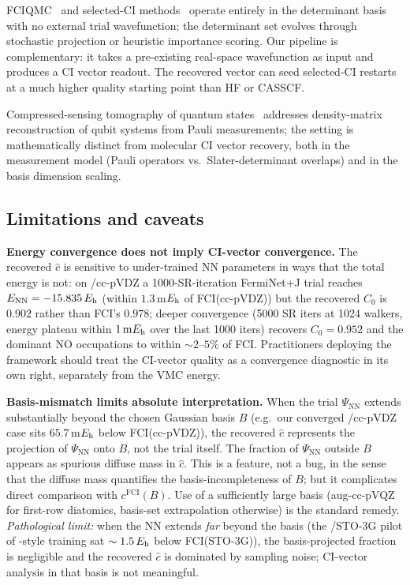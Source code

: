 \documentclass[journal=jctcce,manuscript=article,layout=traditional]{achemso}
\begin{document}
FCIQMC~\cite{Booth2009FCIQMC} and selected-CI
methods~\cite{Holmes2016HCI,Tubman2020ASCI,Garniron2019CIPSI,Eriksen2017MBE}
operate entirely in the determinant basis with no external trial
wavefunction; the determinant set evolves through stochastic
projection or heuristic importance scoring. Our pipeline is
complementary: it takes a pre-existing real-space wavefunction as
input and produces a CI vector readout. The recovered vector can
seed selected-CI restarts at a much higher quality starting point
than HF or CASSCF.

Compressed-sensing tomography of quantum
states~\cite{Gross2010QSCS,Torlai2018NQStomography} addresses
density-matrix reconstruction of qubit systems from Pauli
measurements; the setting is mathematically distinct from molecular
CI vector recovery, both in the measurement model (Pauli operators
vs.\ Slater-determinant overlaps) and in the basis dimension scaling.

\subsection{Limitations and caveats}

\textbf{Energy convergence does not imply CI-vector convergence.}
The recovered $\widehat c$ is sensitive to under-trained NN
parameters in ways that the total energy is not: on
/cc-pVDZ a 1000-SR-iteration FermiNet+J trial reaches
$E_{\rm NN} = -15.835\,E_{\rm h}$ (within $1.3$\,m$E_{\rm h}$ of
FCI(cc-pVDZ)) but the recovered $C_0$ is $0.902$ rather than FCI's
$0.978$; deeper convergence (5000 SR iters at 1024 walkers, energy
plateau within $1\,\mathrm{m}E_{\rm h}$ over the last
1000 iters) recovers $C_0 = 0.952$ and the dominant NO occupations
to within $\sim 2$--$5\%$ of FCI. Practitioners deploying the
framework should treat the CI-vector quality as a convergence
diagnostic in its own right, separately from the VMC energy.

\textbf{Basis-mismatch limits absolute interpretation.}
When the trial $\Psi_{\mathrm{NN}}$ extends substantially beyond the
chosen Gaussian basis $B$ (e.g.\ our converged /cc-pVDZ
case sits $65.7$\,m$E_{\rm h}$ below FCI(cc-pVDZ)), the recovered
$\widehat{c}$ represents the projection of $\Psi_{\mathrm{NN}}$ onto
$B$, not the trial itself. The fraction of $\Psi_{\mathrm{NN}}$
outside $B$ appears as spurious diffuse mass in $\widehat{c}$. This
is a feature, not a bug, in the sense that the diffuse mass
quantifies the basis-incompleteness of $B$; but it complicates
direct comparison with $c^{\mathrm{FCI}}(B)$. Use of a sufficiently
large basis (aug-cc-pVQZ for first-row diatomics, basis-set
extrapolation otherwise) is the standard remedy. \emph{Pathological
limit:} when the NN extends \emph{far} beyond the basis (the
/STO-3G pilot of \cite{Pfau2024ExcitedStates}-style training
sat $\sim 1.5\,E_{\rm h}$ below FCI(STO-3G)), the basis-projected
fraction is negligible and the recovered $\widehat c$ is dominated
by sampling noise; CI-vector analysis in that basis is not
meaningful.
\end{document}
